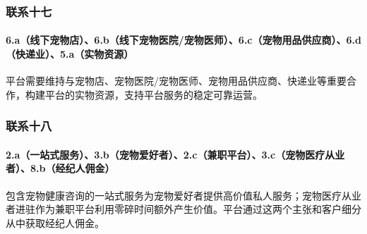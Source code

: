 \documentclass[a4paper]{ctexart}
\begin{document}
\subsubsection{联系十七}
\paragraph{6.a（线下宠物店）、6.b（线下宠物医院/宠物医师）、6.c（宠物用品供应商）、6.d（快递业）、5.a（实物资源）}平台需要维持与宠物店、宠物医院/宠物医师、宠物用品供应商、快递业等重要合作，构建平台的实物资源，支持平台服务的稳定可靠运营。
\subsubsection{联系十八}
\paragraph{2.a（一站式服务）、3.b（宠物爱好者）、2.c（兼职平台）、3.c（宠物医疗从业者）、8.b（经纪人佣金）}包含宠物健康咨询的一站式服务为宠物爱好者提供高价值私人服务；宠物医疗从业者进驻作为兼职平台利用零碎时间额外产生价值。平台通过这两个主张和客户细分从中获取经纪人佣金。
\end{document}

